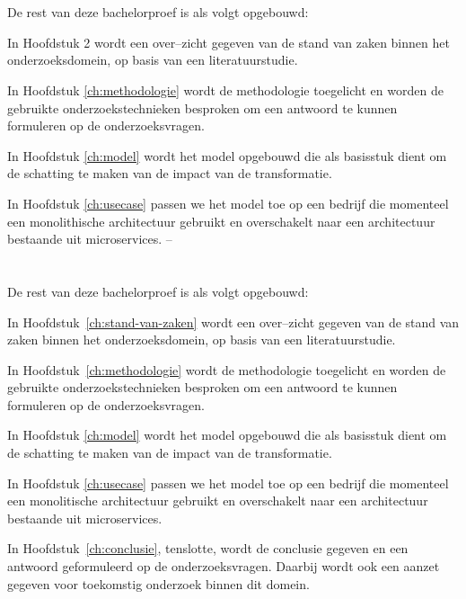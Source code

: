 \section{}
\label{sec:opzet-bachelorproef}


De rest van deze bachelorproef is als volgt opgebouwd:

In Hoofdstuk 2 wordt een over--zicht gegeven van de stand van zaken binnen het onderzoeksdomein, op basis van een literatuurstudie.

In Hoofdstuk \ref{ch:methodologie} wordt de methodologie toegelicht en worden de gebruikte onderzoekstechnieken besproken om een antwoord te kunnen formuleren op de onderzoeksvragen.

In Hoofdstuk \ref{ch:model} wordt het model opgebouwd die als basisstuk dient om de schatting te maken van de impact van de transformatie.

In Hoofdstuk \ref{ch:usecase} passen we het model toe op een bedrijf die momenteel een monolithische architectuur gebruikt en overschakelt naar een architectuur bestaande uit microservices.
--
\section{}
\label{sec:opzet-bachelorproef}


De rest van deze bachelorproef is als volgt opgebouwd:

In Hoofdstuk~\ref{ch:stand-van-zaken} wordt een over--zicht gegeven van de stand van zaken binnen het onderzoeksdomein, op basis van een literatuurstudie.

In Hoofdstuk~\ref{ch:methodologie} wordt de methodologie toegelicht en worden de gebruikte onderzoekstechnieken besproken om een antwoord te kunnen formuleren op de onderzoeksvragen.

In Hoofdstuk \ref{ch:model} wordt het model opgebouwd die als basisstuk dient om de schatting te maken van de impact van de transformatie.

In Hoofdstuk \ref{ch:usecase} passen we het model toe op een bedrijf die momenteel een monolitische architectuur gebruikt en overschakelt naar een architectuur bestaande uit microservices.


In Hoofdstuk~\ref{ch:conclusie}, tenslotte, wordt de conclusie gegeven en een antwoord geformuleerd op de onderzoeksvragen. Daarbij wordt ook een aanzet gegeven voor toekomstig onderzoek binnen dit domein.